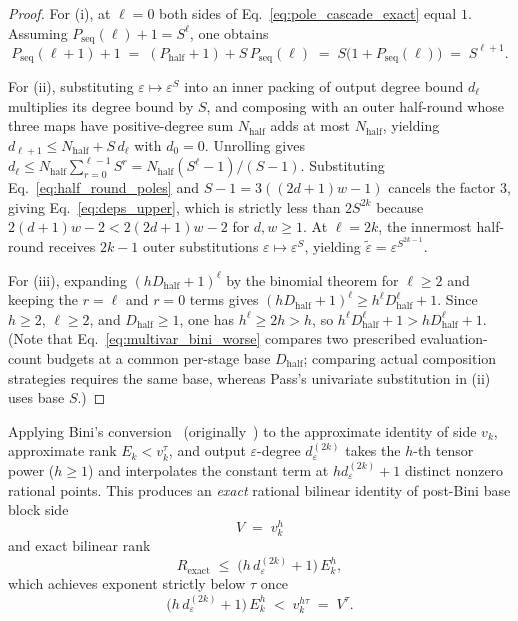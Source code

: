 \documentclass[11pt,a4paper]{article}
\theoremstyle{plain}
\theoremstyle{definition}
\theoremstyle{remark}
\begin{document}
\begin{proof}
For (i), at $\ell = 0$ both sides of Eq.~\eqref{eq:pole_cascade_exact} equal $1$. Assuming $P_{\mathrm{seq}}(\ell) + 1 = S^\ell$, one obtains
\begin{equation}
    P_{\mathrm{seq}}(\ell + 1) + 1 \;=\; (P_{\mathrm{half}} + 1) + S\,P_{\mathrm{seq}}(\ell) \;=\; S\bigl(1 + P_{\mathrm{seq}}(\ell)\bigr) \;=\; S^{\ell+1} .
    \label{eq:pole_induct}
\end{equation}

For (ii), substituting $\varepsilon \mapsto \varepsilon^S$ into an inner packing of output degree bound $d_\ell$ multiplies its degree bound by $S$, and composing with an outer half-round whose three maps have positive-degree sum $N_{\mathrm{half}}$ adds at most $N_{\mathrm{half}}$, yielding $d_{\ell+1} \le N_{\mathrm{half}} + S\,d_\ell$ with $d_0 = 0$. Unrolling gives $d_\ell \le N_{\mathrm{half}}\sum_{r=0}^{\ell-1} S^r = N_{\mathrm{half}}(S^\ell - 1)/(S - 1)$. Substituting Eq.~\eqref{eq:half_round_poles} and $S - 1 = 3((2d + 1)w - 1)$ cancels the factor $3$, giving Eq.~\eqref{eq:deps_upper}, which is strictly less than $2 S^{2k}$ because $2(d + 1)w - 2 < 2(2d + 1)w - 2$ for $d, w \ge 1$. At $\ell = 2k$, the innermost half-round receives $2k - 1$ outer substitutions $\varepsilon \mapsto \varepsilon^S$, yielding $\tilde{\varepsilon} = \varepsilon^{S^{2k-1}}$.

For (iii), expanding $(h D_{\mathrm{half}} + 1)^\ell$ by the binomial theorem for $\ell \ge 2$ and keeping the $r = \ell$ and $r = 0$ terms gives $(h D_{\mathrm{half}} + 1)^\ell \ge h^\ell D_{\mathrm{half}}^\ell + 1$. Since $h \ge 2$, $\ell \ge 2$, and $D_{\mathrm{half}} \ge 1$, one has $h^\ell \ge 2 h > h$, so $h^\ell D_{\mathrm{half}}^\ell + 1 > h D_{\mathrm{half}}^\ell + 1$. (Note that Eq.~\eqref{eq:multivar_bini_worse} compares two prescribed evaluation-count budgets at a common per-stage base $D_{\mathrm{half}}$; comparing actual composition strategies requires the same base, whereas Pass's univariate substitution in (ii) uses base $S$.)
\end{proof}

Applying Bini's conversion~\cite[Lemma~2.4]{Pass2026} (originally~\cite{Bini1980}) to the approximate identity of side $v_k$, approximate rank $E_k < v_k^\tau$, and output $\varepsilon$-degree $d_\varepsilon^{(2k)}$ takes the $h$-th tensor power ($h \ge 1$) and interpolates the constant term at $h d_\varepsilon^{(2k)} + 1$ distinct nonzero rational points. This produces an \emph{exact} rational bilinear identity of post-Bini base block side
\begin{equation}
    V \;=\; v_k^h
    \label{eq:V_post_def}
\end{equation}
and exact bilinear rank
\begin{equation}
    R_{\mathrm{exact}} \;\le\; \bigl(h\,d_\varepsilon^{(2k)} + 1\bigr)\,E_k^h ,
    \label{eq:R_exact_def}
\end{equation}
which achieves exponent strictly below $\tau$ once
\begin{equation}
    \bigl(h\,d_\varepsilon^{(2k)} + 1\bigr)\,E_k^h \;<\; v_k^{h\tau} \;=\; V^\tau .
    \label{eq:bini_condition}
\end{equation}
\end{document}
